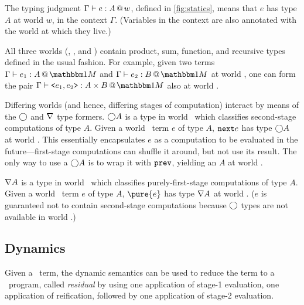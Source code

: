 \begin{abstrsyn}

The typing judgment $\Gamma{} \vdash {e}:{A}~\hspace{-0.15em}\text{@}\hspace{-0.2em}~w$, defined in \ref{fig:statics}, means that
$e$ has type $A$ at world $w$, in the context $\Gamma$. (Variables in the
context are also annotated with the world at which they live.)

All three worlds (\bbonem, \bbonep, and \bbtwo) contain product, sum, function,
and recursive types defined in the usual fashion. For example, given
two terms $\typesone{e_1}A$ and $\typesone{e_2}B$ at world \bbonem, one can form
the pair $\typesone{\texttt{<}e_1,e_2\texttt{>}}{A\times B}$ also at world
\bbonem. 

Differing worlds (and hence, differing stages of computation) interact by means
of the $\bigcirc$ and $\nabla$ type formers. $\bigcirc A$ is a type in world \bbonem\
which classifies second-stage computations of type $A$. Given a world \bbtwo\
term $e$ of type $A$, ${\tt next}{e}$ has type $\bigcirc A$ at world
\bbonem. This essentially encapsulates $e$ as a computation to be evaluated in
the future---first-stage computations can shuffle it around, but not use its
result. The only way to use a $\bigcirc A$ is to wrap it with ${\tt prev}$, yielding an
$A$ at world \bbtwo.


$\nabla A$ is a type in world \bbonem\ which classifies purely-first-stage
computations of type $A$. Given a world \bbonep\ term $e$ of type $A$,
$\pure{e}$ has type $\nabla A$ at world \bbonem. ($e$ is guaranteed not to contain
second-stage computations because $\bigcirc$ types are not available in world
\bbonep.) 



\end{abstrsyn}

\subsection{Dynamics}
\label{sec:stagedsemantics}


Given a \lang\ term, the dynamic semantics can be used
to reduce the term to a \langmono\ program, called {\em residual} by
using one application of stage-1 evaluation, one application of
reification, followed by one application of stage-2 evaluation.

